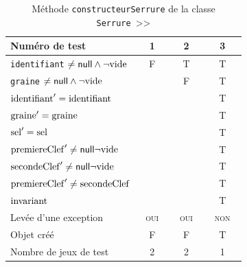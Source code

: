 \documentclass[11pt,article]{article}
\newcommand{\nullvalue}{\textsf{null}\xspace}
\newcommand{\emptyvalue}{\ensuremath\mathrm{vide}}
\newcommand{\invariant}{\ensuremath\mathrm{invariant}}
\begin{document}
\newcommand{\identifiant}{\ensuremath\mathrm{identifiant}}
\newcommand{\graine}{\ensuremath\mathrm{graine}}
\newcommand{\sel}{\ensuremath\mathrm{sel}}
\newcommand{\premiereClef}{\ensuremath\mathrm{premiereClef}}
\newcommand{\secondeClef}{\ensuremath\mathrm{secondeClef}}
\begin{table}[!ht]
\begin{center}
\begin{tabular}{|p{0.4\linewidth}|c|c|c|}
\hline
Numéro de test
&1&2&3\\
\hline
\hline
\texttt{identifiant} $\neq \nullvalue \land \neg \emptyvalue$
&F&T&T\\
\hline
\texttt{graine} $\neq \nullvalue \land \neg \emptyvalue$
& &F&T\\
\hline
\hline
$\identifiant' = \identifiant$
& & &T\\
\hline
$\graine' = \graine$
& & &T\\
\hline
$\sel' = \sel$
& & &T\\
\hline
$\premiereClef' \neq \nullvalue \neg \emptyvalue$
& & &T\\
\hline
$\secondeClef' \neq \nullvalue \neg \emptyvalue$
& & &T\\
\hline
$\premiereClef' \neq \secondeClef$
& & &T\\
\hline
$\invariant$
& & &T\\
\hline
Levée d'une exception&\textsc{oui}&\textsc{oui}&\textsc{non}\\
\hline
\hline
Objet créé
&F&F&T\\
\hline
\hline
Nombre de jeux de test 
&2&2&1\\
\hline
\end{tabular}
\caption{Méthode \texttt{constructeurSerrure} de la
classe \texttt{Serrure}~>>}
\end{center}
\end{table}
\end{document}
